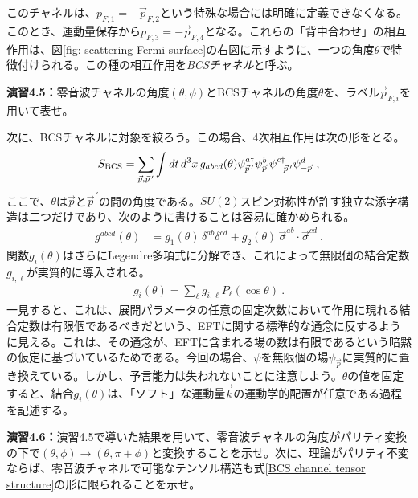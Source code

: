 このチャネルは、$p_{F,1} = - \vec p_{F,2}$という特殊な場合には明確に定義できなくなる。このとき、運動量保存から$p_{F,3} = - \vec p_{F,4}$となる。これらの「背中合わせ」の相互作用は、図\ref{fig: scattering Fermi surface}の右図に示すように、一つの角度$\theta$で特徴付けられる。この種の相互作用を\emph{BCSチャネル}と呼ぶ。
%
\begin{eBox}
%
{\bf 演習4.5：}零音波チャネルの角度$(\theta,\phi)$とBCSチャネルの角度$\theta$を、ラベル$\vec p_{F,i}$を用いて表せ。
%
\end{eBox}
%
次に、BCSチャネルに対象を絞ろう。この場合、4次相互作用は次の形をとる。
%
\begin{align}
	S_{\rm BCS} = \sum_{\vec p,\vec p^{\, \prime}} \int dt \, d^3 x \,  g_{abcd} (\theta)  \psi_{\vec p^{\, \prime}}^{a \dag}   \psi_{\vec p}^b  \, \psi_{- \vec p^{\, \prime}}^{c\dag} \psi_{- \vec p}^d \ ,
\end{align}
%
ここで、$\theta$は$\vec p$と$\vec p^{\, \prime}$の間の角度である。$SU(2)$スピン対称性が許す独立な添字構造は二つだけであり、次のように書けることは容易に確かめられる。
%
\begin{align} \label{BCS channel tensor structure}
	g^{abcd} (\theta) &= g_1 (\theta) \, \delta^{ab} \delta^{cd} + g_2	 (\theta) \, \vec \sigma^{ab} \cdot \vec \sigma^{cd} \ . 
\end{align}
%
関数$g_i(\theta)$はさらにLegendre多項式に分解でき、これによって無限個の結合定数$g_{i, \ell}$が実質的に導入される。
%
\begin{align}
	g_i (\theta) = \sum_{\ell} g_{i,\ell} P_\ell (\cos \theta) \ .
\end{align}
%
一見すると、これは、展開パラメータの任意の固定次数において作用に現れる結合定数は有限個であるべきだという、EFTに関する標準的な通念に反するように見える。これは、その通念が、EFTに含まれる場の数は有限であるという暗黙の仮定に基づいているためである。今回の場合、$\psi$を無限個の場$\psi_{\vec p}$に実質的に置き換えている。しかし、予言能力は失われないことに注意しよう。$\theta$の値を固定すると、結合$g_i (\theta)$は、「ソフト」な運動量$\vec k$の運動学的配置が任意である過程を記述する。

% 
\begin{eBox}
%
{\bf 演習4.6：}演習4.5で導いた結果を用いて、零音波チャネルの角度がパリティ変換の下で$(\theta, \phi) \to (\theta, \pi+ \phi)$と変換することを示せ。次に、理論がパリティ不変ならば、零音波チャネルで可能なテンソル構造も式\eqref{BCS channel tensor structure}の形に限られることを示せ。
%
\end{eBox}
%

